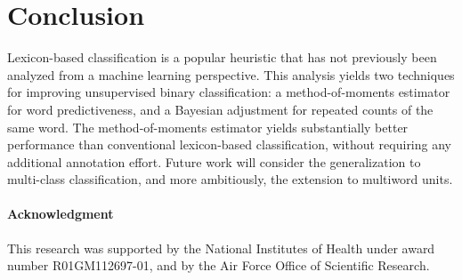 \section{Conclusion}
Lexicon-based classification is a popular heuristic that has not previously been analyzed from a machine learning perspective. This analysis yields two techniques for improving unsupervised binary classification: a method-of-moments estimator for word predictiveness, and a Bayesian adjustment for repeated counts of the same word. The method-of-moments estimator yields substantially better performance than conventional lexicon-based classification, without requiring any additional annotation effort. Future work will consider the generalization to multi-class classification, and more ambitiously, the extension to multiword units.

\vspace{-9pt}
\begin{small}
\paragraph{Acknowledgment} This research was supported by the National Institutes of Health under award number R01GM112697-01, and by the Air Force Office of Scientific Research.
\end{small}

